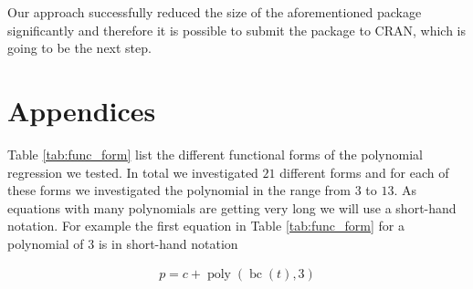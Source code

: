 \documentclass[12pt,a4paper]{article}
\DeclareMathOperator{\bc}{bc}
\DeclareMathOperator{\poly}{poly}
\begin{document}
Our approach successfully reduced the size of the aforementioned package
significantly and therefore it is possible to submit the package to
\ac{CRAN}, which is going to be the next step.

\pagebreak

\setcounter{page}{3}
\printbibliography[title = References]
\cleardoublepage

\begin{refsection}
\nocite{R-base}
\nocite{R-stargazer}
\nocite{R-stringr}
\nocite{R-tidyr}
\nocite{R-dplyr}
\nocite{R-glmnet}
\nocite{R-class}
\nocite{R-MASS}
\nocite{R-plm}
\nocite{R-leaps}
\nocite{R-caret}
\nocite{R-tree}
\nocite{R-gbm}
\nocite{R-plotmo}
\nocite{R-pls}
\nocite{R-splines}
\nocite{R-tictoc}
\nocite{R-plotly}
\nocite{R-inspectdf}
\nocite{R-rpart}
\nocite{R-rpart.plot}
\nocite{R-stargazer}
\nocite{R-knitr}
\nocite{R-purrr}
\nocite{R-randomForest}
\nocite{R-rstudioapi}





\nocite{R-Studio}

\printbibliography[title = Software-References]
\end{refsection}

\cleardoublepage
\appendix
\setcounter{table}{0}
\setcounter{figure}{0}
\renewcommand{\thetable}{A\arabic{table}}
\renewcommand{\thefigure}{A\arabic{figure}}


\hypertarget{appendices}{%
\section{Appendices}\label{appendices}}

Table \ref{tab:func_form} list the different functional forms of the
polynomial regression we tested. In total we investigated \(21\)
different forms and for each of these forms we investigated the
polynomial in the range from \(3\) to \(13\). As equations with many
polynomials are getting very long we will use a short-hand notation. For
example the first equation in Table \ref{tab:func_form} for a polynomial
of \(3\) is in short-hand notation

\begin{align}
    p = c + \poly\left( \bc(t), 3 \right)
\end{align}
\end{document}
